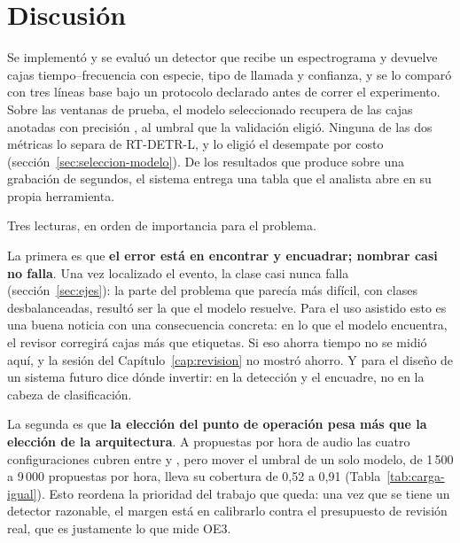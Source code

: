\section{Discusión}
\label{sec:discusion-oe2}

 Se implementó y se evaluó un detector que recibe un
espectrograma y devuelve cajas tiempo--frecuencia con especie, tipo de llamada y
confianza, y se lo comparó con tres líneas base bajo un protocolo declarado antes
de correr el experimento. Sobre las \nWindowsTest{} ventanas de prueba, el modelo
seleccionado recupera \rRecallYol{} de las \nBoxesTest{} cajas anotadas
\rRecallCiYol{} con precisión \rPrecisionYol{}, al umbral que la validación
eligió. Ninguna de las dos métricas lo separa de RT-DETR-L, y lo eligió el
desempate por costo (sección~\ref{sec:seleccion-modelo}). De los \rDemoDetections{} resultados que produce sobre una
grabación de \rDemoSeconds{} segundos, el sistema entrega una tabla que el
analista abre en su propia herramienta.

 Tres lecturas, en orden de importancia para el problema.

La primera es que \textbf{el error está en encontrar y encuadrar; nombrar casi
    no falla}. Una vez localizado el evento, la clase casi nunca falla
(sección~\ref{sec:ejes}): la parte del problema que parecía más difícil, con
\nClasses{} clases desbalanceadas, resultó ser la que el modelo resuelve. Para el uso asistido esto es una buena noticia con
una consecuencia concreta: en lo que el modelo encuentra, el revisor corregirá
cajas más que etiquetas. Si eso ahorra tiempo no se midió aquí, y la sesión del
Capítulo~\ref{cap:revision} no mostró ahorro. Y para el
diseño de un sistema futuro dice dónde invertir: en la detección y el encuadre, no
en la cabeza de clasificación.

La segunda es que \textbf{la elección del punto de operación pesa más que la
    elección de la arquitectura}. A \rBudgetCommon{} propuestas por hora de audio
las cuatro configuraciones cubren entre \rCovkFrc{} y \rCovkYol{}, pero mover el
umbral de un solo modelo, de 1\,500 a 9\,000 propuestas por hora, lleva su
cobertura de 0,52 a 0,91 (Tabla~\ref{tab:carga-igual}).
Esto reordena la prioridad del trabajo que queda: una vez que se tiene un
detector razonable, el margen está en calibrarlo contra el presupuesto de revisión
real, que es justamente lo que mide OE3.

